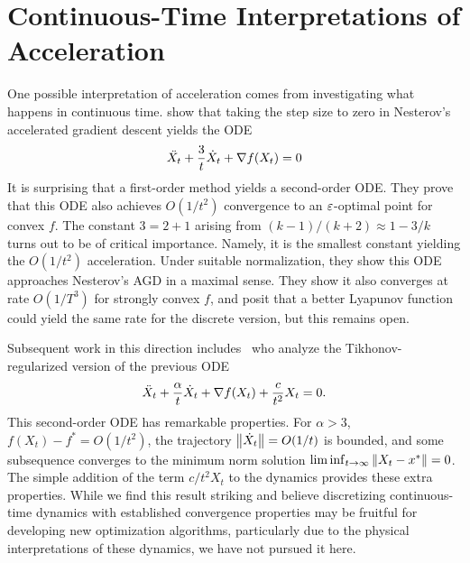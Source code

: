 \section{Continuous-Time Interpretations of Acceleration}
One possible interpretation of acceleration comes from investigating what happens in continuous time. \citet{su2016differential} show that taking the step size to zero in Nesterov's accelerated gradient descent yields the ODE
\begin{align*}
    \ddot{X_t} + \frac{3}{t} \dot X_t + \nabla f(X_t) = 0 
\end{align*}
It is surprising that a first-order method yields a second-order ODE. They prove that this ODE also achieves $O(1/t^2)$ convergence to an $\varepsilon$-optimal point for convex $f$. The constant $3 = 2 + 1$ arising from $(k-1)/(k+2) \approx 1 - 3/k$ turns out to be of critical importance. Namely, it is the smallest constant yielding the $O(1/t^2)$ acceleration. Under suitable normalization, they show this ODE approaches Nesterov's AGD in a maximal sense. They show it also converges at rate $O(1/T^3)$ for strongly convex $f$, and posit that a better Lyapunov function could yield the same rate for the discrete version, but this remains open. 

Subsequent work in this direction includes~\citet{attouch2024convex} who analyze the Tikhonov-regularized version of the previous ODE
\begin{align*}
    \ddot X_t + \frac{\alpha}{t} \dot X_t + \nabla f(X_t) + \frac{c}{t^2}X_t = 0.
\end{align*}
This second-order ODE has remarkable properties. For $\alpha > 3$, $f(X_t) - f^* = O(1/t^2)$, the trajectory $\left\lVert \dot X_t \right\rVert = O(1/t)$ is bounded, and some subsequence converges to the minimum norm solution $\liminf_{t \to \infty} \left\lVert X_t - x^* \right\rVert = 0$. The simple addition of the term $c/t^2 X_t$ to the dynamics provides these extra properties. While we find this result striking and believe discretizing continuous-time dynamics with established convergence properties may be fruitful for developing new optimization algorithms, particularly due to the physical interpretations of these dynamics, we have not pursued it here. 

